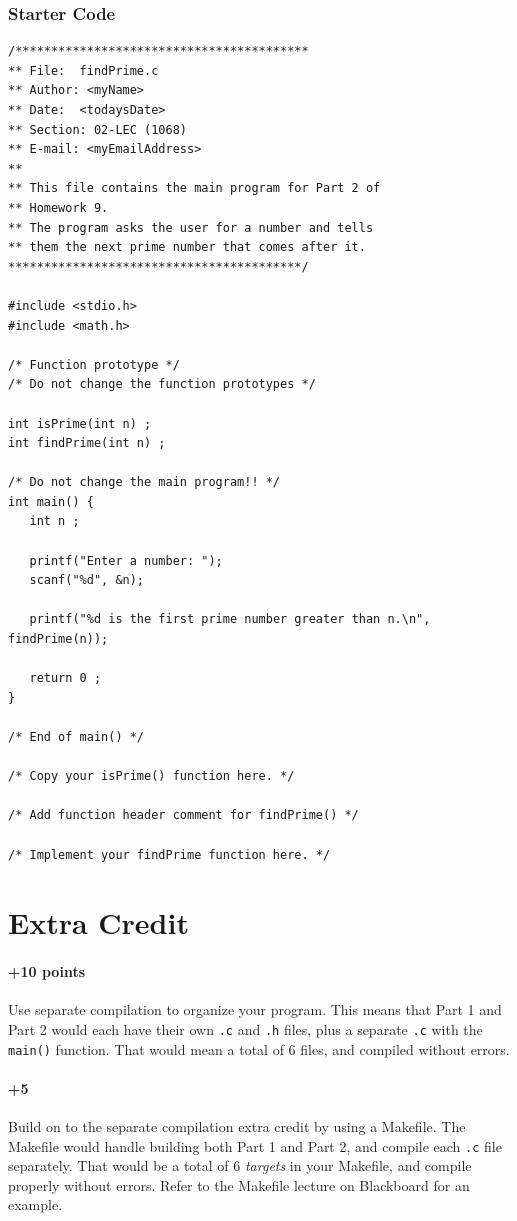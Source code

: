 \documentclass[letter,11pt]{article}
\begin{document}
\subsubsection*{Starter Code}
\begin{verbatim}
/*****************************************
** File:  findPrime.c
** Author: <myName>
** Date:  <todaysDate>
** Section: 02-LEC (1068)
** E-mail: <myEmailAddress>
**
** This file contains the main program for Part 2 of
** Homework 9.
** The program asks the user for a number and tells
** them the next prime number that comes after it.
*****************************************/

#include <stdio.h>
#include <math.h>

/* Function prototype */
/* Do not change the function prototypes */

int isPrime(int n) ;
int findPrime(int n) ;

/* Do not change the main program!! */
int main() {
   int n ;

   printf("Enter a number: ");
   scanf("%d", &n);

   printf("%d is the first prime number greater than n.\n", findPrime(n));

   return 0 ;
}

/* End of main() */

/* Copy your isPrime() function here. */

/* Add function header comment for findPrime() */

/* Implement your findPrime function here. */
\end{verbatim}

\section*{Extra Credit}
\paragraph{+10 points}Use separate compilation to organize your program. This means that Part 1 and Part 2 would each have their own \texttt{.c} and \texttt{.h} files, plus a separate \texttt{.c} with the \texttt{main()} function. That would mean a total of 6 files, and compiled without errors.
\paragraph{+5}Build on to the separate compilation extra credit by using a Makefile. The Makefile would handle building both Part 1 and Part 2, and compile each \texttt{.c} file separately. That would be a total of 6 \textit{targets} in your Makefile, and compile properly without errors. Refer to the Makefile lecture on Blackboard for an example.
\end{document}
